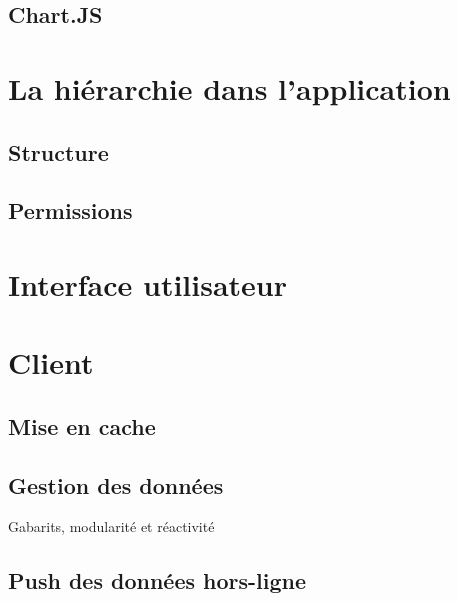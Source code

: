 \documentclass{EPL-master-thesis-covers-FR}
\begin{document}
			\subsection*{Chart.JS}
				
				

		\section{La hiérarchie dans l'application}


			\subsection*{Structure}

			

			\subsection*{Permissions}

			

		\section{Interface utilisateur}

		\section{Client}


			\subsection*{Mise en cache}
				\label{sec:cache_client}

			
			\subsection*{Gestion des données}
				Gabarits, modularité et réactivité

			\subsection*{Push des données hors-ligne}
				\label{sec:service_worker}
				
\end{document}
